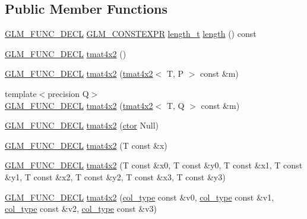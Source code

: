 \subsection*{Public Member Functions}
\begin{DoxyCompactItemize}
\item 
\hyperlink{setup_8hpp_ab2d052de21a70539923e9bcbf6e83a51}{G\+L\+M\+\_\+\+F\+U\+N\+C\+\_\+\+D\+E\+CL} \hyperlink{setup_8hpp_a08b807947b47031d3a511f03f89645ad}{G\+L\+M\+\_\+\+C\+O\+N\+S\+T\+E\+X\+PR} \hyperlink{namespaceglm_a090a0de2260835bee80e71a702492ed9}{length\+\_\+t} \hyperlink{structglm_1_1detail_1_1tmat4x2_afdfba9df6d72c33018c0080dd48691ab}{length} () const
\item 
\hyperlink{setup_8hpp_ab2d052de21a70539923e9bcbf6e83a51}{G\+L\+M\+\_\+\+F\+U\+N\+C\+\_\+\+D\+E\+CL} \hyperlink{structglm_1_1detail_1_1tmat4x2_a02a3962d6a1b2609f082e4b022a4c028}{tmat4x2} ()
\item 
\hyperlink{setup_8hpp_ab2d052de21a70539923e9bcbf6e83a51}{G\+L\+M\+\_\+\+F\+U\+N\+C\+\_\+\+D\+E\+CL} \hyperlink{structglm_1_1detail_1_1tmat4x2_ab3c1fcf781e0219e317fde204095696a}{tmat4x2} (\hyperlink{structglm_1_1detail_1_1tmat4x2}{tmat4x2}$<$ T, P $>$ const \&m)
\item 
{\footnotesize template$<$precision Q$>$ }\\\hyperlink{setup_8hpp_ab2d052de21a70539923e9bcbf6e83a51}{G\+L\+M\+\_\+\+F\+U\+N\+C\+\_\+\+D\+E\+CL} \hyperlink{structglm_1_1detail_1_1tmat4x2_ac81c7bdc54e869320b7fe713ef361f4c}{tmat4x2} (\hyperlink{structglm_1_1detail_1_1tmat4x2}{tmat4x2}$<$ T, Q $>$ const \&m)
\item 
\hyperlink{setup_8hpp_ab2d052de21a70539923e9bcbf6e83a51}{G\+L\+M\+\_\+\+F\+U\+N\+C\+\_\+\+D\+E\+CL} \hyperlink{structglm_1_1detail_1_1tmat4x2_a2abefa2846a92e5b1f5efc365a784791}{tmat4x2} (\hyperlink{structglm_1_1detail_1_1tmat4x2_a4266befa296229458f2652dcc4ba4a72}{ctor} Null)
\item 
\hyperlink{setup_8hpp_ab2d052de21a70539923e9bcbf6e83a51}{G\+L\+M\+\_\+\+F\+U\+N\+C\+\_\+\+D\+E\+CL} \hyperlink{structglm_1_1detail_1_1tmat4x2_a7e8cb6213554a2961c3725c89e3eb168}{tmat4x2} (T const \&x)
\item 
\hyperlink{setup_8hpp_ab2d052de21a70539923e9bcbf6e83a51}{G\+L\+M\+\_\+\+F\+U\+N\+C\+\_\+\+D\+E\+CL} \hyperlink{structglm_1_1detail_1_1tmat4x2_af11c8214ce2df13c925feeae262c1916}{tmat4x2} (T const \&x0, T const \&y0, T const \&x1, T const \&y1, T const \&x2, T const \&y2, T const \&x3, T const \&y3)
\item 
\hyperlink{setup_8hpp_ab2d052de21a70539923e9bcbf6e83a51}{G\+L\+M\+\_\+\+F\+U\+N\+C\+\_\+\+D\+E\+CL} \hyperlink{structglm_1_1detail_1_1tmat4x2_a5e5749116ce86b6d1d0bd43d6c2158b0}{tmat4x2} (\hyperlink{structglm_1_1detail_1_1tmat4x2_a7ff0997d9fa4f93eba8a6530ca2cd3f7}{col\+\_\+type} const \&v0, \hyperlink{structglm_1_1detail_1_1tmat4x2_a7ff0997d9fa4f93eba8a6530ca2cd3f7}{col\+\_\+type} const \&v1, \hyperlink{structglm_1_1detail_1_1tmat4x2_a7ff0997d9fa4f93eba8a6530ca2cd3f7}{col\+\_\+type} const \&v2, \hyperlink{structglm_1_1detail_1_1tmat4x2_a7ff0997d9fa4f93eba8a6530ca2cd3f7}{col\+\_\+type} const \&v3)

\end{DoxyCompactItemize}
